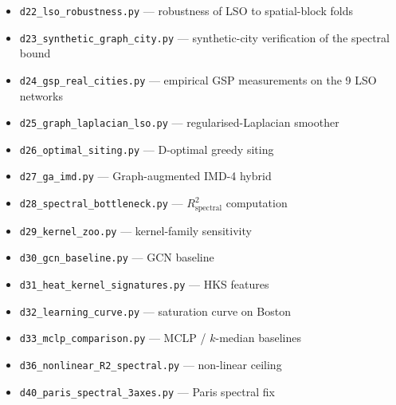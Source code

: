 \documentclass[11pt,a4paper]{article}
\newcommand{\1}{\mathbb{1}}
\theoremstyle{plain}
\theoremstyle{definition}
\theoremstyle{remark}
\begin{document}
\begin{itemize}[leftmargin=*,itemsep=0pt]
\item \texttt{d22\_lso\_robustness.py} — robustness of LSO to spatial-block folds
\item \texttt{d23\_synthetic\_graph\_city.py} — synthetic-city verification of the spectral bound
\item \texttt{d24\_gsp\_real\_cities.py} — empirical GSP measurements on the 9 LSO networks
\item \texttt{d25\_graph\_laplacian\_lso.py} — regularised-Laplacian smoother
\item \texttt{d26\_optimal\_siting.py} — D-optimal greedy siting
\item \texttt{d27\_ga\_imd.py} — Graph-augmented IMD-4 hybrid
\item \texttt{d28\_spectral\_bottleneck.py} — $R^2_{\mathrm{spectral}}$ computation
\item \texttt{d29\_kernel\_zoo.py} — kernel-family sensitivity
\item \texttt{d30\_gcn\_baseline.py} — GCN baseline
\item \texttt{d31\_heat\_kernel\_signatures.py} — HKS features
\item \texttt{d32\_learning\_curve.py} — saturation curve on Boston
\item \texttt{d33\_mclp\_comparison.py} — MCLP / $k$-median baselines
\item \texttt{d36\_nonlinear\_R2\_spectral.py} — non-linear ceiling
\item \texttt{d40\_paris\_spectral\_3axes.py} — Paris spectral fix
\end{itemize}


\end{document}
